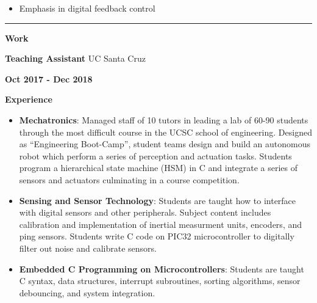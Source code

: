 \documentclass[paper=a4,fontsize=11pt]{article} %
\def \sectionSpace      {0.3cm}    %
\def \leftColSpace      {0.1}       %
\def \middleColSpace    {0.73}       %
\def \bigMiddleColSpace {0.8}       %
\def \rightColSpace     {0.25}      %
\def \lineWidth         {20.25cm}   %
\def \lineThickness     {1pt}     %
\begin{document}
    \noindent
    \begin{minipage}[t]{\leftColSpace\linewidth}
        \hfill
    \end{minipage}
    \begin{minipage}[t]{\bigMiddleColSpace\linewidth}
        \begin{itemize}[noitemsep,topsep=0pt]
            \item Emphasis in digital feedback control
        \end{itemize}
    \end{minipage}
    \vspace{-0.275cm}

    \vspace{\sectionSpace}
    \noindent\rule{\lineWidth}{\lineThickness}

    \noindent
    \begin{minipage}[t]{\leftColSpace\linewidth}
        \noindent \textbf{Work}
    \end{minipage}
    \begin{minipage}[t]{\middleColSpace\linewidth}
        \noindent \textbf{Teaching Assistant} \quad UC Santa Cruz
    \end{minipage}
    \begin{minipage}[t]{\rightColSpace\linewidth}
        \noindent \textbf{Oct 2017 - Dec 2018}
    \end{minipage}

    \noindent
    \begin{minipage}[t]{\leftColSpace\linewidth}
        \noindent \textbf{Experience}
    \end{minipage}
    \begin{minipage}[t]{\bigMiddleColSpace\linewidth}
        \begin{itemize}[noitemsep,topsep=0pt]
            \item \textbf{Mechatronics}: Managed staff of 10 tutors in leading a lab of 60-90 students through the most difficult course in the UCSC school of engineering. Designed as “Engineering Boot-Camp”, student teams design and build an autonomous robot which perform a series of perception and actuation tasks. Students program a hierarchical state machine (HSM) in C and integrate a series of sensors and actuators culminating in a course competition.
            \item \textbf{Sensing and Sensor Technology}: Students are taught how to interface with digital sensors and other peripherals. Subject content includes calibration and implementation of inertial measurment units, encoders, and ping sensors. Students write C code on PIC32 microcontroller to digitally filter out noise and calibrate sensors.
            \item \textbf{Embedded C Programming on Microcontrollers}: Students are taught C syntax, data structures, interrupt subroutines, sorting algorithms, sensor debouncing, and system integration.
        \end{itemize}
    \end{minipage}
\end{document}

